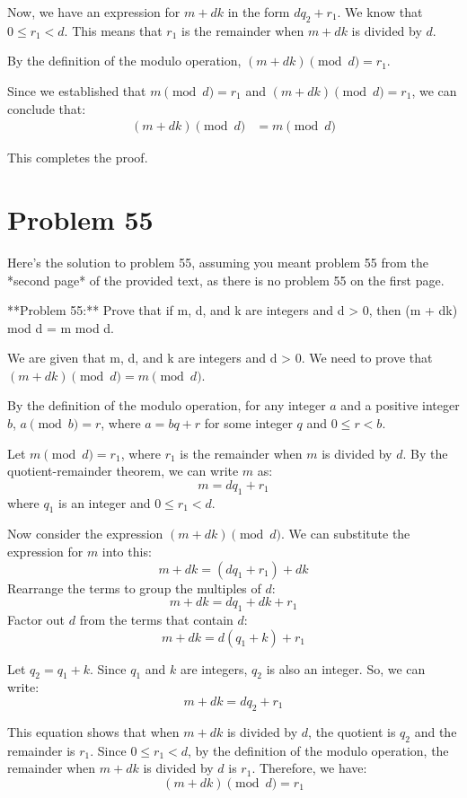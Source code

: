 \documentclass{article}
\begin{document}
Now, we have an expression for $m + dk$ in the form $dq_2 + r_1$.
We know that $0 \leq r_1 < d$. This means that $r_1$ is the remainder when $m + dk$ is divided by $d$.

By the definition of the modulo operation, $(m + dk) \pmod d = r_1$.

Since we established that $m \pmod d = r_1$ and $(m + dk) \pmod d = r_1$, we can conclude that:
\begin{align*} (m + dk) \pmod d &= m \pmod d \end{align*}

This completes the proof.

\newpage

\section*{Problem 55}
Here's the solution to problem 55, assuming you meant problem 55 from the *second page* of the provided text, as there is no problem 55 on the first page.

**Problem 55:** Prove that if m, d, and k are integers and d > 0, then (m + dk) mod d = m mod d.

We are given that m, d, and k are integers and d > 0. We need to prove that $(m + dk) \pmod d = m \pmod d$.

By the definition of the modulo operation, for any integer $a$ and a positive integer $b$, $a \pmod b = r$, where $a = bq + r$ for some integer $q$ and $0 \le r < b$.

Let $m \pmod d = r_1$, where $r_1$ is the remainder when $m$ is divided by $d$.
By the quotient-remainder theorem, we can write $m$ as:
$$m = dq_1 + r_1$$
where $q_1$ is an integer and $0 \le r_1 < d$.

Now consider the expression $(m + dk) \pmod d$. We can substitute the expression for $m$ into this:
$$m + dk = (dq_1 + r_1) + dk$$
Rearrange the terms to group the multiples of $d$:
$$m + dk = dq_1 + dk + r_1$$
Factor out $d$ from the terms that contain $d$:
$$m + dk = d(q_1 + k) + r_1$$

Let $q_2 = q_1 + k$. Since $q_1$ and $k$ are integers, $q_2$ is also an integer.
So, we can write:
$$m + dk = dq_2 + r_1$$

This equation shows that when $m + dk$ is divided by $d$, the quotient is $q_2$ and the remainder is $r_1$.
Since $0 \le r_1 < d$, by the definition of the modulo operation, the remainder when $m + dk$ is divided by $d$ is $r_1$.
Therefore, we have:
$$(m + dk) \pmod d = r_1$$
\end{document}
